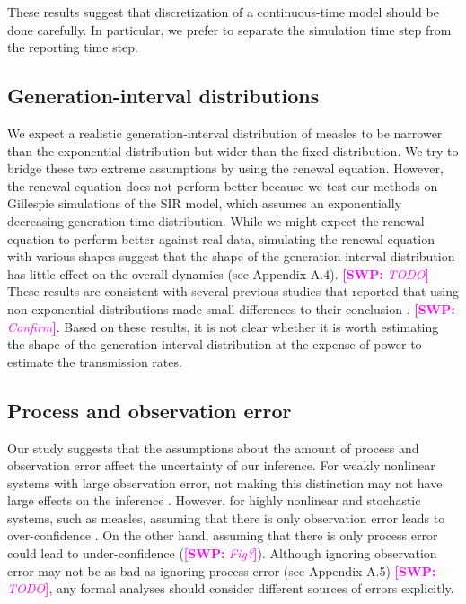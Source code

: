 \documentclass{article}
\newcommand{\comment}[3]{\textcolor{#1}{\textbf{[#2: }\textsl{#3}\textbf{]}}}
\newcommand{\swp}[1]{\comment{magenta}{SWP}{#1}}
\begin{document}
These results suggest that discretization of a continuous-time model should be done carefully.
In particular, we prefer to separate the simulation time step from the reporting time step.

\subsection{Generation-interval distributions}

We expect a realistic generation-interval distribution of measles to be narrower than the exponential distribution but wider than the fixed distribution.
We try to bridge these two extreme assumptions by using the renewal equation.
However, the renewal equation does not perform better because we test our methods on Gillespie simulations of the SIR model, which assumes an exponentially decreasing generation-time distribution.
While we might expect the renewal equation to perform better against real data, simulating the renewal equation with various shapes suggest that the shape of the generation-interval distribution has little effect on the overall dynamics (see Appendix A.4). \swp{TODO}
These results are consistent with several previous studies that reported that using non-exponential distributions made small differences to their conclusion \citep{he2009plug}. \swp{Confirm}.
Based on these results, it is not clear whether it is worth estimating the shape of the generation-interval distribution at the expense of power to estimate the transmission rates.

\subsection{Process and observation error}

Our study suggests that the assumptions about the amount of process and observation error affect the uncertainty of our inference.
For weakly nonlinear systems with large observation error, not making this distinction may not have large effects on the inference \citep{ma2014estimating}.
However, for highly nonlinear and stochastic systems, such as measles, assuming that there is only observation error leads to over-confidence \citep{king2015avoidable, taylor2016stochasticity}.
On the other hand, assuming that there is only process error could lead to under-confidence (\swp{Fig?}).
Although ignoring observation error may not be as bad as ignoring process error (see Appendix A.5) \swp{TODO}, any formal analyses should consider different sources of errors explicitly.
\end{document}
